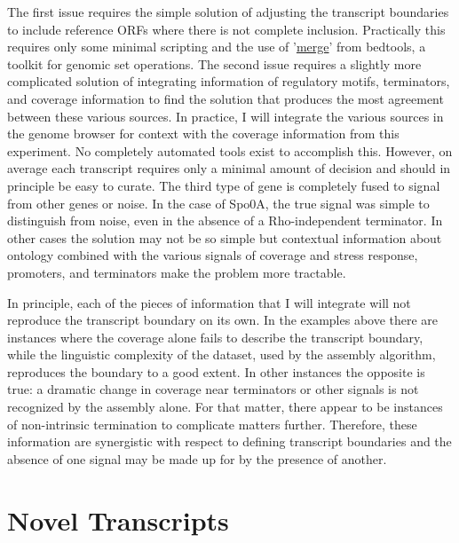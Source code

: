The first issue requires the simple solution of adjusting the transcript boundaries to include reference ORFs where there is not complete inclusion. Practically this requires only some minimal scripting and the use of '\href{http://bedtools.readthedocs.org/en/latest/content/tools/merge.html}{merge}' from bedtools, a toolkit for genomic set operations. The second issue requires a slightly more complicated solution of integrating information of regulatory motifs, terminators, and coverage information to find the solution that produces the most agreement between these various sources. In practice, I will integrate the various sources in the genome browser for context with the coverage information from this experiment. No completely automated tools exist to accomplish this. However, on average each transcript requires only a minimal amount of decision and should in principle be easy to curate. The third type of gene is completely fused to signal from other genes or noise. In the case of Spo0A, the true signal was simple to distinguish from noise, even in the absence of a Rho-independent terminator. In other cases the solution may not be so simple but contextual information about ontology combined with the various signals of coverage and stress response, promoters, and terminators make the problem more tractable. 

In principle, each of the pieces of information that I will integrate will not reproduce the transcript boundary on its own. In the examples above there are instances where the coverage alone fails to describe the transcript boundary, while the linguistic complexity of the dataset, used by the assembly algorithm, reproduces the boundary to a good extent. In other instances the opposite is true: a dramatic change in coverage near terminators or other signals is not recognized by the assembly alone. For that matter, there appear to be instances of non-intrinsic termination to complicate matters further. Therefore, these information are synergistic with respect to defining transcript boundaries and the absence of one signal may be made up for by the presence of another.

\section{Novel Transcripts}




